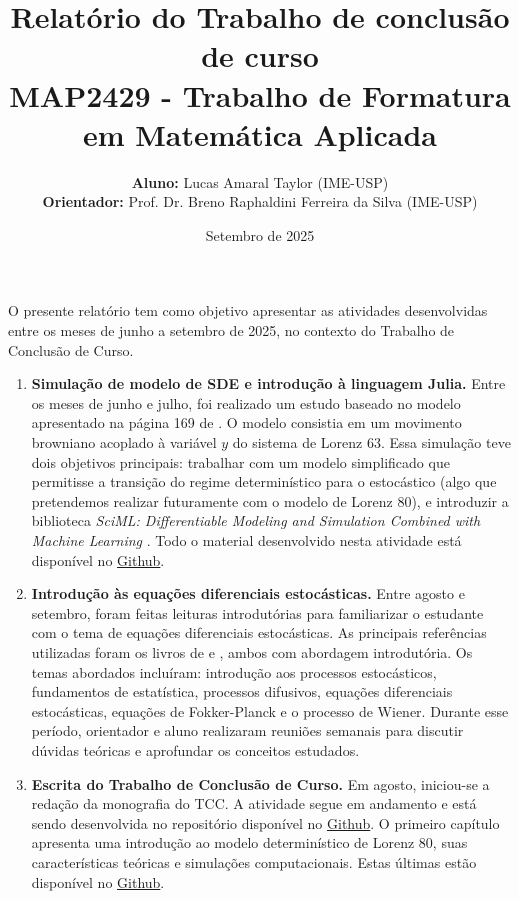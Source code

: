 \documentclass[12pt]{article}
\title{Relatório do Trabalho de conclusão de curso \\ \large{MAP2429 - Trabalho de Formatura em Matemática Aplicada}}
\date{Setembro de 2025}
\author{
\textbf{Aluno:} Lucas Amaral Taylor (IME-USP)\\
\textbf{Orientador:} Prof. Dr. Breno Raphaldini Ferreira da Silva (IME-USP)
}
\begin{document}
\maketitle

O presente relatório tem como objetivo apresentar as atividades desenvolvidas entre os meses de junho a setembro de 2025, no contexto do Trabalho de Conclusão de Curso.

\begin{enumerate}
	\item \textbf{Simulação de modelo de SDE e introdução à linguagem Julia.} Entre os meses de junho e julho, foi realizado um estudo baseado no modelo apresentado na página 169 de \citet{Pavliotis2008}. O modelo consistia em um movimento browniano acoplado à variável $y$ do sistema de Lorenz 63. Essa simulação teve dois objetivos principais: trabalhar com um modelo simplificado que permitisse a transição do regime determinístico para o estocástico (algo que pretendemos realizar futuramente com o modelo de Lorenz 80), e introduzir a biblioteca \textit{SciML: Differentiable Modeling and Simulation Combined with Machine Learning} \citep{Rackauckas2017}. Todo o material desenvolvido nesta atividade está disponível no \textcolor{blue}{\href{https://github.com/lucasamtaylor01/Lorenz80_SDE/tree/portuguese-version/05_WIENER_ACOPLADO}{Github}}.
	
	\item \textbf{Introdução às equações diferenciais estocásticas.} Entre agosto e setembro, foram feitas leituras introdutórias para familiarizar o estudante com o tema de equações diferenciais estocásticas. As principais referências utilizadas foram os livros de \citet{Pavliotis2014} e \cite{Evans2014}, ambos com abordagem introdutória. Os temas abordados incluíram: introdução aos processos estocásticos, fundamentos de estatística, processos difusivos, equações diferenciais estocásticas, equações de Fokker-Planck e o processo de Wiener. Durante esse período, orientador e aluno realizaram reuniões semanais para discutir dúvidas teóricas e aprofundar os conceitos estudados.

	\item \textbf{Escrita do Trabalho de Conclusão de Curso.} Em agosto, iniciou-se a redação da monografia do TCC. A atividade segue em andamento e está sendo desenvolvida no repositório disponível no \textcolor{blue}{\href{https://github.com/lucasamtaylor01/Lorenz80_SDE/tree/portuguese-version/00_TCC}{Github}}. O primeiro capítulo apresenta uma introdução ao modelo determinístico de Lorenz 80, suas características teóricas e simulações computacionais. Estas últimas estão disponível no \textcolor{blue}{\href{https://github.com/lucasamtaylor01/Lorenz80_SDE/tree/portuguese-version/06_LORENZ_80}{Github}}.
\end{enumerate}

\newpage
\nocite{*}
\printbibliography
\end{document}
